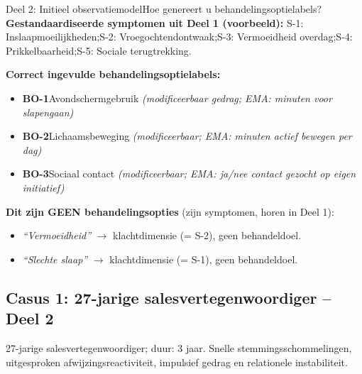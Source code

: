 \documentclass[11pt,a4paper]{article}
\begin{document}
\vspace{0.5em}
\nopagebreak[4]

\begin{voorbeeldbox}{Deel 2: Initieel observatiemodel}{Hoe genereert u behandelingsoptielabels?}
\small
\textbf{Gestandaardiseerde symptomen uit Deel 1 (voorbeeld):}
S-1: Inslaapmoeilijkheden;\enspace S-2: Vroegochtendontwaak;\enspace S-3: Vermoeidheid overdag;\enspace S-4: Prikkelbaarheid;\enspace S-5: Sociale terugtrekking.

\medskip
\textbf{Correct ingevulde behandelingsoptielabels:}
\begin{itemize}[topsep=2pt,itemsep=1pt]
\item \textbf{BO-1}\enspace Avondschermgebruik
  \hfill\textit{(modificeerbaar gedrag; EMA: minuten voor slapengaan)}
\item \textbf{BO-2}\enspace Lichaamsbeweging
  \hfill\textit{(modificeerbaar; EMA: minuten actief bewegen per dag)}
\item \textbf{BO-3}\enspace Sociaal contact
  \hfill\textit{(modificeerbaar; EMA: ja/nee contact gezocht op eigen initiatief)}
\end{itemize}

\medskip
\textbf{\color{StrongRed}Dit zijn GEEN behandelingsopties} (zijn symptomen, horen in Deel 1):
\begin{itemize}[topsep=1pt,itemsep=0pt]
\item \textit{``Vermoeidheid''} $\rightarrow$ klachtdimensie (= S-2), geen behandeldoel.
\item \textit{``Slechte slaap''} $\rightarrow$ klachtdimensie (= S-1), geen behandeldoel.
\end{itemize}
\end{voorbeeldbox}

\vspace{0.5em}

\newpage
\subsection*{Casus 1: 27-jarige salesvertegenwoordiger -- Deel 2}

\begin{complaintbox}[title={Casus 1: verkorte klachtomschrijving}]
\small 27-jarige salesvertegenwoordiger; duur: 3 jaar. Snelle stemmingsschommelingen, uitgesproken afwijzingsreactiviteit, impulsief gedrag en relationele instabiliteit.
\end{complaintbox}
\end{document}
